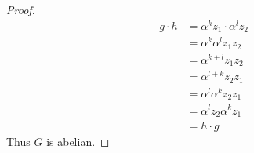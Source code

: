 \documentclass[a4paper,12pt]{extarticle}
\theoremstyle{definition}
\begin{document}
\begin{itemize}
\begin{enumerate}[label=(\alph*)]
\begin{proof}
\begin{align*}
            g\cdot h&=\alpha^kz_1\cdot\alpha^lz_2\\
            &=\alpha^k\alpha^lz_1z_2\\
            &=\alpha^{k+l}z_1z_2\\
            &=\alpha^{l+k}z_2z_1\\
            &=\alpha^{l}\alpha^kz_2z_1\\
            &=\alpha^lz_2\alpha^kz_1\\
            &=h\cdot g
        \end{align*} Thus $G$ is abelian.
        \end{proof}
    \end{enumerate}
\end{itemize}
\end{document}
